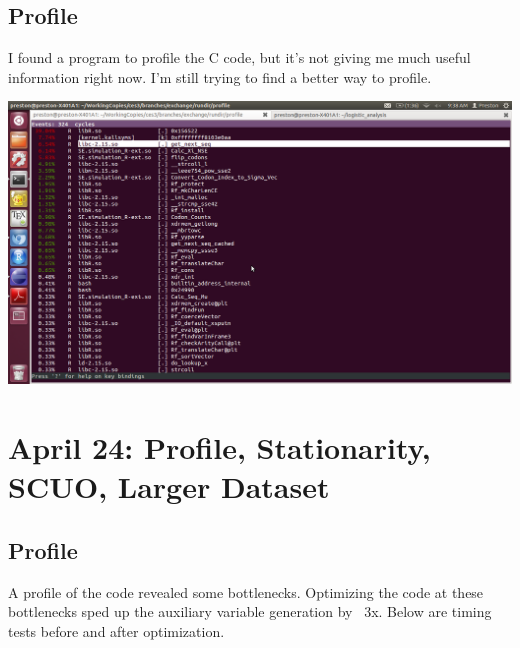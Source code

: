 \documentclass{article}
\begin{document}
\newpage	 	
	 	
	 \subsection{Profile}
	 
	 I found a program to profile the C code, but it's not giving me much useful information right now. I'm still trying to find a better way to profile.
	 
	 \includegraphics[scale=0.4]{../profile/profile.png}
	 
 \section{April 24: Profile, Stationarity, SCUO, Larger Dataset}
 
 \subsection{Profile}
 
 	A profile of the code revealed some bottlenecks. Optimizing the code at these bottlenecks sped up the auxiliary variable generation by ~3x. Below are timing tests before and after optimization.
 	
\end{document}
